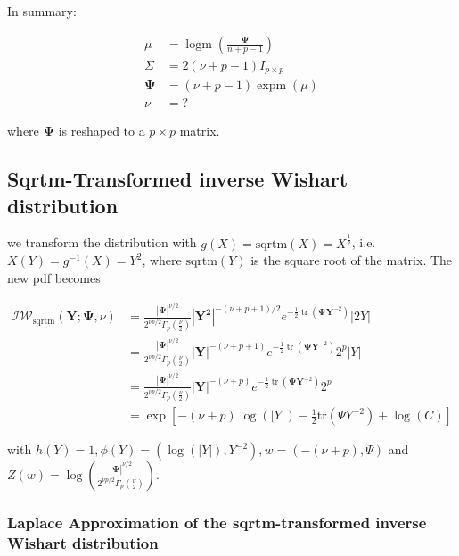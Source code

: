 In summary: 

\begin{subequations}
\begin{align}
	\mu &= \operatorname{logm}\left(\frac{\mathbf\Psi}{n+p-1}\right) \\
	\Sigma &= 2(\nu+p-1) I_{p\times p} \\
	\mathbf{\Psi} &=  (\nu+p-1)\operatorname{expm}(\mu) \\
	\nu &= ?
\end{align}
\end{subequations}

where $\mathbf{\Psi}$ is reshaped to a $p \times p$ matrix. 

\subsection{Sqrtm-Transformed inverse Wishart distribution}

we transform the distribution with $g(X) = \text{sqrtm}(X) = X^{\frac{1}{2}}$, i.e. $X(Y) = g^{-1}(X) = Y^2$, where $\text{sqrtm}(Y)$ is the square root of the matrix. The new pdf becomes 

\begin{subequations}
\begin{align}
	\mathcal{IW}_{\operatorname{sqrtm}}({\mathbf Y}; {\mathbf \Psi}, \nu) &= \frac{\left|{\mathbf\Psi}\right|^{\nu/2}}{2^{\nu p/2}\Gamma_p(\frac \nu 2)} \left|\mathbf{Y^2}\right|^{-(\nu+p+1)/2} e^{-\frac{1}{2}\operatorname{tr}(\mathbf\Psi\mathbf{Y}^{-2})} |2Y| \\
	&= \frac{\left|{\mathbf\Psi}\right|^{\nu/2}}{2^{\nu p/2}\Gamma_p(\frac \nu 2)} \left|\mathbf{Y}\right|^{-(\nu+p+1)} e^{-\frac{1}{2}\operatorname{tr}(\mathbf\Psi\mathbf{Y}^{-2})} 2^p|Y| \\
	&= \frac{\left|{\mathbf\Psi}\right|^{\nu/2}}{2^{\nu p/2}\Gamma_p(\frac \nu 2)} \left|\mathbf{Y}\right|^{-(\nu+p)} e^{-\frac{1}{2}\operatorname{tr}(\mathbf\Psi\mathbf{Y}^{-2})} 2^p \\ 
	&= \exp\left[-(\nu + p) \log(|Y|) - \frac{1}{2}\text{tr}(\Psi Y^{-2}) + \log(C)\right]
\end{align}
\end{subequations}

with $h(Y) = 1, \phi(Y) = (\log(|Y|), Y^{-2}), w = (-(\nu + p), \Psi)$ and $Z(w) = \log\left( \frac{\left|{\mathbf\Psi}\right|^{\nu/2}}{2^{\nu p/2}\Gamma_p(\frac \nu 2)}\right)$. 

\subsubsection{Laplace Approximation of the sqrtm-transformed inverse Wishart distribution}

